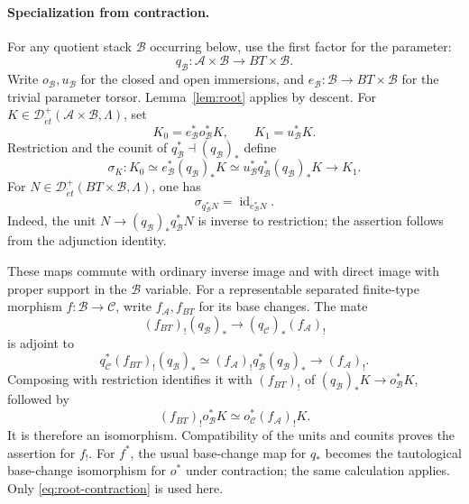 \documentclass[11pt,a4paper]{article}
\newcommand{\Det}{\mathcal D_{\acute et}}
\newcommand{\cA}{\mathscr A}
\theoremstyle{notes}
\begin{document}
\paragraph{Specialization from contraction.}
For any quotient stack $\mathscr B$ occurring below, use the first factor for the parameter:
\[
q_{\mathscr B}:\cA\times\mathscr B\to BT\times\mathscr B.
\]
Write $o_{\mathscr B},u_{\mathscr B}$ for the closed and open immersions, and $e_{\mathscr B}:\mathscr B\to BT\times\mathscr B$ for the trivial parameter torsor. Lemma~\ref{lem:root} applies by descent. For $K\in\Det^+(\cA\times\mathscr B,\Lambda)$, set
\[
K_0=e_{\mathscr B}^*o_{\mathscr B}^*K,\qquad K_1=u_{\mathscr B}^*K.
\]
Restriction and the counit of $q_{\mathscr B}^*\dashv(q_{\mathscr B})_*$ define
\begin{equation}\label{eq:parameter-specialization}
\sigma_K:K_0\simeq e_{\mathscr B}^*(q_{\mathscr B})_*K
\simeq u_{\mathscr B}^*q_{\mathscr B}^*(q_{\mathscr B})_*K
\longrightarrow K_1.
\end{equation}
For $N\in\Det^+(BT\times\mathscr B,\Lambda)$, one has
\begin{equation}\label{eq:constant-specialization}
\sigma_{q_{\mathscr B}^*N}=\operatorname{id}_{e_{\mathscr B}^*N}.
\end{equation}
Indeed, the unit $N\to(q_{\mathscr B})_*q_{\mathscr B}^*N$ is inverse to restriction; the assertion follows from the adjunction identity.

These maps commute with ordinary inverse image and with direct image with proper support in the $\mathscr B$ variable. For a representable separated finite-type morphism $f:\mathscr B\to\mathscr C$, write $f_{\cA},f_{BT}$ for its base changes. The mate
\[
(f_{BT})_!(q_{\mathscr B})_*
\longrightarrow(q_{\mathscr C})_*(f_{\cA})_!
\]
is adjoint to
\[
q_{\mathscr C}^*(f_{BT})_!(q_{\mathscr B})_*
\simeq(f_{\cA})_!q_{\mathscr B}^*(q_{\mathscr B})_*
\longrightarrow(f_{\cA})_!.
\]
Composing with restriction identifies it with $(f_{BT})_!$ of
$(q_{\mathscr B})_*K\to o_{\mathscr B}^*K$, followed by
\[
(f_{BT})_!o_{\mathscr B}^*K
\simeq o_{\mathscr C}^*(f_{\cA})_!K.
\]
It is therefore an isomorphism. Compatibility of the units and counits proves the assertion for $f_!$. For $f^*$, the usual base-change map for $q_*$ becomes the tautological base-change isomorphism for $o^*$ under contraction; the same calculation applies. Only \eqref{eq:root-contraction} is used here.
\end{document}
